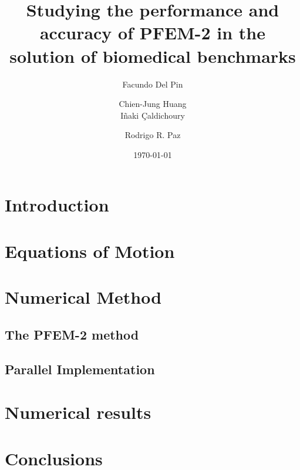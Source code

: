 \documentclass[twocolumn]{svjour3}          %
\begin{document}
\title{Studying the performance and accuracy of PFEM-2 in the solution of biomedical benchmarks}
\author{Facundo Del Pin\and Chien-Jung Huang \\ I\~naki \c{C}aldichoury\and Rodrigo R. Paz}
\date{\today}

\maketitle

\begin{abstract}

\end{abstract}


\section{Introduction}


\section{Equations of Motion}


\section{Numerical Method}
  
 \subsection{The PFEM-2 method}
  
 \subsection{Parallel Implementation}
  

\section{Numerical results}



\section{Conclusions}


\begin{thebibliography}{9}
  
\end{thebibliography}
\end{document}

